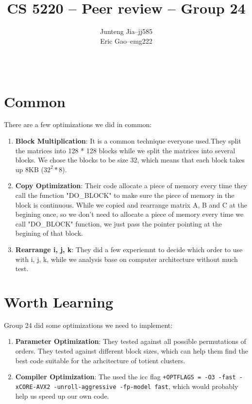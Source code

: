 \documentclass[11pt]{article}
\title{CS 5220 -- Peer review -- Group 24} %
\author{
  \begin{tabular}{l c l}
    Junteng Jia & -- & jj585 \\
    Eric Gao & -- & emg222
  \end{tabular}\\
  \rule{\linewidth}{0.4pt}
}
\date{}
\begin{document}
    \thispagestyle{empty}
    \maketitle

	\section*{Common}
		There are a few optimizations we did in common:
		\begin{enumerate}
			\item \textbf{Block Multiplication}: It is a common technique everyone used.They split the matrices into 128 * 128 blocks while we split the matrices into several blocks. We chose the blocks to be size 32, which means that each block takes up 8KB ($32^2 * 8$).
			\item \textbf{Copy Optimization}: Their code allocate a piece of memory every time they call the function "DO\_BLOCK" to make sure the piece of memory in the block is continuous. While we copied and rearrange matrix A, B and C at the begining once, so we don't need to allocate a piece of memory every time we call "DO\_BLOCK" function, we just pass the pointer pointing at the begining of that block.
			\item \textbf{Rearrange i, j, k}: They did a few experiemnt to decide which order to use with i, j, k, while we analysis base on computer architecture without much test.
		\end{enumerate}



    \section*{Worth Learning}
	    Group 24 did some optimizations we need to implement:
        \begin{enumerate}
        	\item \textbf{Parameter Optimization}: They tested against all possible permutations of orders. They tested against different block sizes, which can help them find the best code suitable for the arhcitecture of totient clusters.
        	\item \textbf{Compiler Optimization}: The used the icc flag \texttt{+OPTFLAGS = -O3 -fast -xCORE-AVX2 -unroll-aggressive -fp-model fast}, which would probably help us speed up our own code.
        \end{enumerate}
        
        
       
\end{document}
